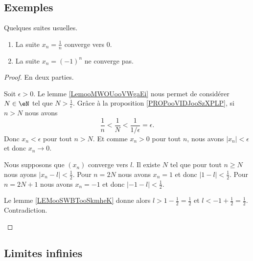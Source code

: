 \subsection{Exemples}

\begin{lemma}       \label{LEMooNDSKooMsexOq}
	Quelques suites usuelles.
	\begin{enumerate}
		\item		\label{ITEMooWTAYooRisBLO}
		      La suite \( x_n=\frac{1}{ n }\) converge vers \( 0\).
		\item	\label{ITEMooOYSEooROKIKs}
		      La suite \( x_n=(-1)^n\) ne converge pas.
	\end{enumerate}
\end{lemma}

\begin{proof}
	En deux parties.
	\begin{subproof}
		Soit \( \epsilon>0\). Le lemme \ref{LemooMWOUooVWgaEi} nous permet de considérer \( N\in \eN\) tel que \( N>\frac{1}{ \epsilon}\). Grâce à la proposition \ref{PROPooVIDJooSzXPLP}, si \( n>N\) nous avons
		\begin{equation}
			\frac{1}{  n}<\frac{1}{ N}<\frac{1}{ 1/\epsilon}=\epsilon.
		\end{equation}
		Donc \( x_n<\epsilon\) pour tout \( n>N\). Et comme \( x_n>0\) pour tout \( n\), nous avons \( | x_n |<\epsilon\) et donc \( x_n\to 0\).

		Nous supposons que \( (x_n)\) converge vers \( l\). Il existe \( N\) tel que pour tout \( n\geq N\) nous ayons \( | x_n-l |<\frac{1}{ 2}\). Pour \( n=2N\) nous avons \( x_n=1\) et donc \( | 1-l |<\frac{1}{ 2}\). Pour \( n=2N+1\) nous avons \( x_n=-1\) et donc \( | -1-l |<\frac{1}{ 2}\).

		Le lemme \ref{LEMooSWBTooSkmheK} donne alors \( l>1-\frac{ 1 }{2}=\frac{ 1 }{2}\) et \( l<-1+\frac{ 1 }{2}=\frac{ 1 }{2}\). Contradiction.
	\end{subproof}
\end{proof}

\subsection{Limites infinies}

